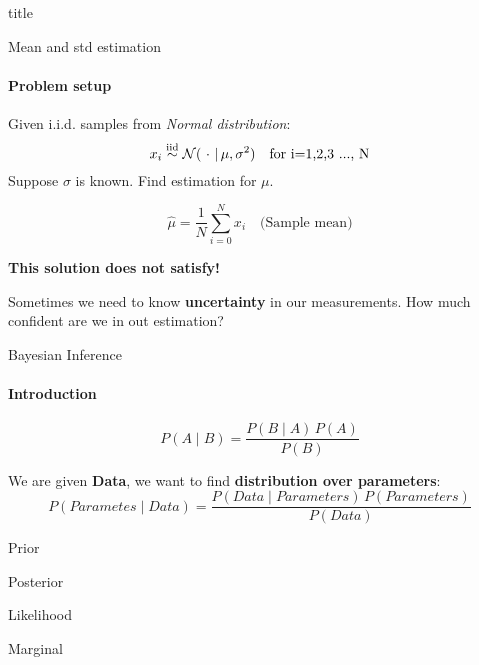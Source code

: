 \begin{frame}{}
\begin{beamercolorbox}[sep=8pt,center,shadow=true,rounded=true]{title}
    \par%
\end{beamercolorbox}
    
\end{frame}



\begin{frame}{Mean and std estimation}
\framesubtitle{Problem setup}


\begin{problem}
Given i.i.d. samples from \textit{Normal distribution}:
\begin{equation*}
x_i \overset{\text{iid}}{\sim} \mathcal{N}(\,\, \cdot \,\, | \, \mu, \sigma^2) \text{\quad  for i=1,2,3 ..., N}
\end{equation*}
Suppose $\sigma$ is known. Find estimation for $\mu$.
\end{problem}
\pause
\begin{solution}
\begin{equation*}
    \hat{\mu} = \frac{1}{N} \sum_{i=0}^N{x_i} \quad \text{(Sample mean)}
\end{equation*}
\end{solution}
\pause
\textbf{This solution does not satisfy!}

Sometimes we need to know \textbf{uncertainty} in our measurements.
How much confident are we in out estimation?
\end{frame}

\begin{frame}{Bayesian Inference}
\framesubtitle{Introduction}
\begin{theorem}
\begin{equation*}
P(A \mid B) = \frac{P(B \mid A) \, P(A)}{P(B)}
\end{equation*}
\end{theorem}
\pause
\begin{example}
We are given \textbf{Data}, we want to find \textbf{distribution over parameters}:
\begin{equation*}
    P( Parametes \mid Data ) = \frac{P( Data \mid Parameters ) \, P(Parameters)}{P(Data)}
\end{equation*}
\end{example}
\pause
\begin{description}[leftmargin=1cm, labelwidth=3cm]
\item[$P(Parameters)$] Prior
\item[$P( Parametes \mid Data ) $] Posterior
\item[$P( Data \mid Parameters )$] Likelihood
\item[$P(Data)$] Marginal
\end{description}
\end{frame}

